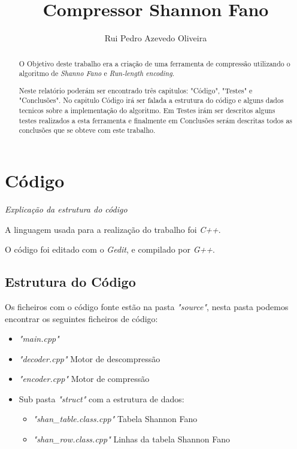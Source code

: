 \documentclass[11pt,a4paper]{report}
\author{Rui Pedro Azevedo Oliveira}
\title{Compressor  Shannon Fano}
\begin{document}
 
\maketitle
\tableofcontents 

\begin{abstract}

O Objetivo deste trabalho era a criação de uma ferramenta de compressão utilizando o algoritmo de \textit{Shanno Fano} e \textit{Run-length encoding}. 

Neste relatório poderám ser encontrado três capitulos: "Código", "Testes" e "Conclusões". No capitulo Código irá ser falada a estrutura do código e alguns dados tecnicos sobre a implementação do algoritmo. Em Testes irám ser descritos alguns testes realizados a esta ferramenta e finalmente em Conclusões serám descritas todos as conclusões que se obteve com este trabalho.

\end{abstract}
 

\chapter{Código}
\centerline{\textit{Explicação da estrutura do código}}

\vspace{6cm}
A linguagem usada para a realização do trabalho foi \textit{C++}.

O código foi editado com o \textit{Gedit}, e compilado por \textit{G++}.
\newpage
\section{Estrutura do Código}

Os ficheiros com o código fonte estão na pasta \textit{"source"}, nesta pasta podemos encontrar os seguintes ficheiros de código: 
\begin{itemize}
\item \textit{"main.cpp"} 
\item \textit{"decoder.cpp"} Motor de descompressão
\item \textit{"encoder.cpp"} Motor de compressão
\item Sub pasta \textit{"struct"} com a estrutura de dados:
	\begin{itemize}
		\item \textit{"shan\_table.class.cpp"} Tabela Shannon Fano			
		\item \textit{"shan\_row.class.cpp"} Linhas da tabela Shannon Fano
	\end{itemize}
\end{itemize}
\end{document}
